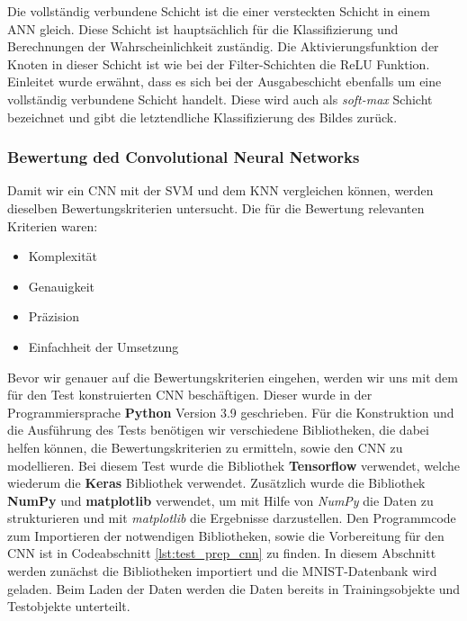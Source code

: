 Die vollständig verbundene Schicht ist die einer versteckten Schicht in einem ANN gleich. Diese Schicht ist hauptsächlich für die Klassifizierung und Berechnungen der Wahrscheinlichkeit zuständig. Die Aktivierungsfunktion der Knoten in dieser Schicht ist wie bei der Filter-Schichten die ReLU Funktion.
Einleitet wurde erwähnt, dass es sich bei der Ausgabeschicht ebenfalls um eine vollständig verbundene Schicht handelt. Diese wird auch als \textit{soft-max} Schicht bezeichnet und gibt die letztendliche Klassifizierung des Bildes zurück.\cite*{Sewak2018}

\newpage

\subsubsection{Bewertung ded Convolutional Neural Networks}

Damit wir ein CNN mit der SVM und dem KNN vergleichen können, werden dieselben Bewertungskriterien untersucht. Die für die Bewertung relevanten Kriterien waren:

\begin{itemize}
    \item Komplexität
    \item Genauigkeit
    \item Präzision
    \item Einfachheit der Umsetzung
\end{itemize}

Bevor wir genauer auf die Bewertungskriterien eingehen, werden wir uns mit dem für den Test konstruierten CNN beschäftigen.
Dieser wurde in der Programmiersprache \textbf{Python} Version 3.9 geschrieben. Für die Konstruktion und die Ausführung des Tests benötigen wir verschiedene Bibliotheken, die dabei helfen können, die Bewertungskriterien zu ermitteln, sowie den CNN zu modellieren. Bei diesem Test wurde die Bibliothek \textbf{Tensorflow} verwendet, welche wiederum die \textbf{Keras} Bibliothek verwendet. Zusätzlich wurde die Bibliothek \textbf{NumPy} und \textbf{matplotlib} verwendet, um mit Hilfe von \textit{NumPy} die Daten zu strukturieren und mit \textit{matplotlib} die Ergebnisse darzustellen. Den Programmcode zum Importieren der notwendigen Bibliotheken, sowie die Vorbereitung für den CNN ist in Codeabschnitt \ref{lst:test_prep_cnn} zu finden. In diesem Abschnitt werden zunächst die Bibliotheken importiert und die MNIST-Datenbank wird geladen. Beim Laden der Daten werden die Daten bereits in Trainingsobjekte und Testobjekte unterteilt.

